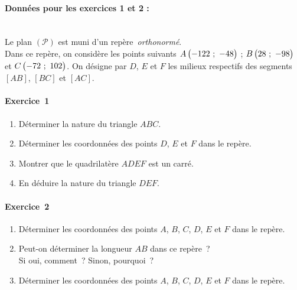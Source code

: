\begin{minipage}{0.45\textwidth}
\thispagestyle{sujet1}

\vspace*{1em}

\paragraph{Données pour les exercices 1 et 2 :}~\\
Le plan $\left(\mathscr{P}\right)$ est muni d'un repère~\emph{orthonormé}.\\ Dans ce repère, on considère les points suivants $A\begin{pmatrix}-122~;~-48\end{pmatrix}$ ; $B\begin{pmatrix}28~;~-98\end{pmatrix}$ et $C\begin{pmatrix}-72~;~102\end{pmatrix}$.
On désigne par $D$, $E$ et $F$ les milieux respectifs des segments $\left[AB\right]$,  $\left[BC\right]$ et $\left[AC\right]$.

\vspace*{2em}

\paragraph{Exercice~1}

\begin{enumerate}
	\item Déterminer la nature du triangle $ABC$.
	\item Déterminer les coordonnées des points $D$, $E$ et $F$ dans le repère.
	\item Montrer que le quadrilatère $ADEF$ est un carré.
	\item En déduire la nature du triangle $DEF$.
\end{enumerate}

\paragraph{Exercice~2} 

\begin{enumerate}
	\item Déterminer les coordonnées des points $A$, $B$, $C$, $D$, $E$ et $F$ dans le repère.
	\item Peut-on déterminer la longueur $AB$ dans ce repère~?\\Si oui, comment~? Sinon, pourquoi~?
	\item Déterminer les coordonnées des points $A$, $B$, $C$, $D$, $E$ et $F$ dans le repère.
\end{enumerate}


\end{minipage}
